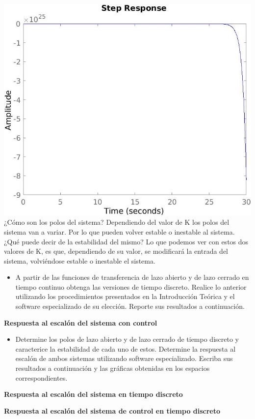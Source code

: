\includegraphics[scale=0.36]{./img2/G6.jpg}\\
¿Cómo son los polos del sistema? Dependiendo del valor de K los polos del sistema van a variar. Por lo que pueden volver estable o inestable al sistema.\\
¿Qué puede decir de la estabilidad del mismo? Lo que podemos ver con estos dos valores de K, es que, dependiendo de su valor, se modificará la entrada del sistema, volviéndose estable o inestable el sistema.

\begin{itemize}
	\item A partir de las funciones de transferencia de lazo abierto y de lazo cerrado en tiempo continuo obtenga las versiones de tiempo discreto. Realice lo anterior utilizando los procedimientos presentados en la
	Introducción Teórica y el software especializado de su elección. Reporte sus resultados a continuación.
\end{itemize}

\textbf{Respuesta al escalón del sistema con control}

\begin{itemize}
	\item Determine los polos de lazo abierto y de lazo cerrado de tiempo discreto y caracterice la estabilidad de
	cada uno de estos. Determine la respuesta al escalón de ambos sistemas utilizando software especializado.
	Escriba sus resultados a continuación y las gráficas obtenidas en los espacios correspondientes.
\end{itemize}


\textbf{Respuesta al escalón del sistema en tiempo discreto}

\textbf{Respuesta al escalón del sistema de control en tiempo discreto}